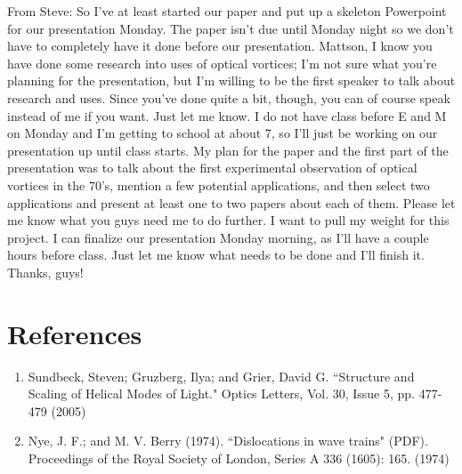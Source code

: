 \documentclass{article}
\begin{document}
From Steve: So I've at least started our paper and put up a skeleton Powerpoint for our presentation Monday. The paper isn't due until Monday night so we don't have to completely have it done before our presentation. Mattson, I know you have done some research into uses of optical vortices; I'm not sure what you're planning for the presentation, but I'm willing to be the first speaker to talk about research and uses. Since you've done quite a bit, though, you can of course speak instead of me if you want. Just let me know. I do not have class before E and M on Monday and I'm getting to school at about 7, so I'll just be working on our presentation up until class starts. My plan for the paper and the first part of the presentation was to talk about the first experimental observation of optical vortices in the 70's, mention a few potential applications, and then select two applications and present at least one to two papers about each of them. Please let me know what you guys need me to do further. I want to pull my weight for this project. I can finalize our presentation Monday morning, as I'll have a couple hours before class. Just let me know what needs to be done and I'll finish it. Thanks, guys!



\section*{References}
\begin{enumerate}
	\item{Sundbeck, Steven; Gruzberg, Ilya; and Grier, David G. ``Structure and Scaling of  Helical Modes of Light." Optics Letters, Vol. 30, Issue 5, pp. 477-479 (2005)}
	\item{Nye, J. F.; and M. V. Berry (1974). ``Dislocations in wave trains" (PDF). Proceedings of the Royal Society of London, Series A 336 (1605): 165. (1974)}
\end{enumerate}
\end{document}
